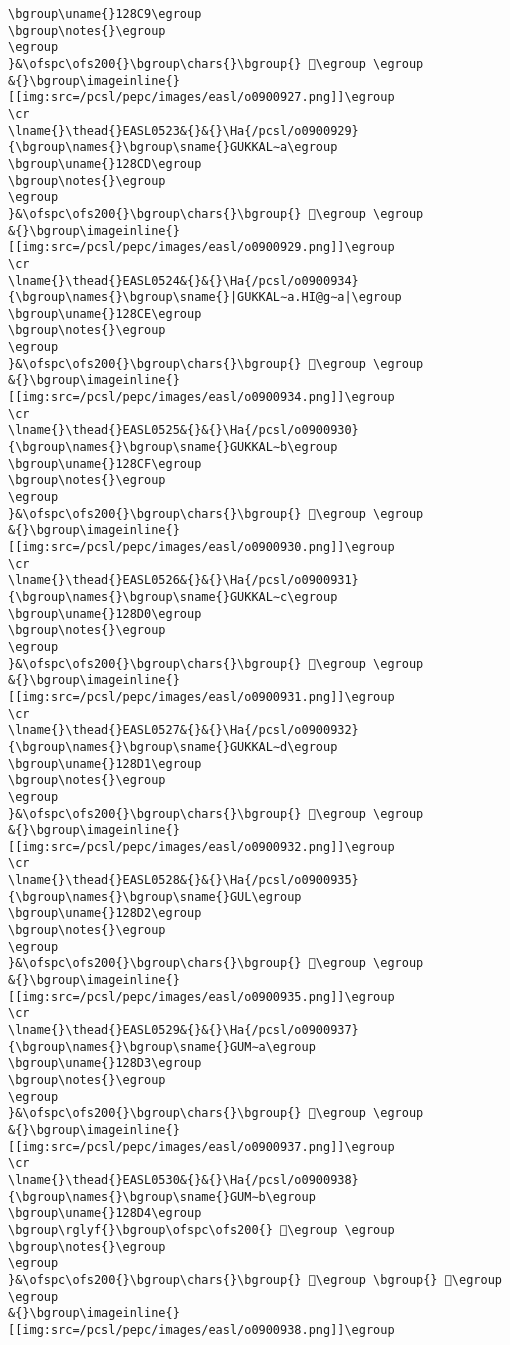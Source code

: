 \begin{verbatim}
\bgroup\uname{}128C9\egroup
\bgroup\notes{}\egroup
\egroup
}&\ofspc\ofs200{}\bgroup\chars{}\bgroup{} 𒣉\egroup \egroup
&{}\bgroup\imageinline{}[[img:src=/pcsl/pepc/images/easl/o0900927.png]]\egroup
\cr
\lname{}\thead{}EASL0523&{}&{}\Ha{/pcsl/o0900929}{\bgroup\names{}\bgroup\sname{}GUKKAL∼a\egroup
\bgroup\uname{}128CD\egroup
\bgroup\notes{}\egroup
\egroup
}&\ofspc\ofs200{}\bgroup\chars{}\bgroup{} 𒣍\egroup \egroup
&{}\bgroup\imageinline{}[[img:src=/pcsl/pepc/images/easl/o0900929.png]]\egroup
\cr
\lname{}\thead{}EASL0524&{}&{}\Ha{/pcsl/o0900934}{\bgroup\names{}\bgroup\sname{}|GUKKAL∼a.HI@g∼a|\egroup
\bgroup\uname{}128CE\egroup
\bgroup\notes{}\egroup
\egroup
}&\ofspc\ofs200{}\bgroup\chars{}\bgroup{} 𒣎\egroup \egroup
&{}\bgroup\imageinline{}[[img:src=/pcsl/pepc/images/easl/o0900934.png]]\egroup
\cr
\lname{}\thead{}EASL0525&{}&{}\Ha{/pcsl/o0900930}{\bgroup\names{}\bgroup\sname{}GUKKAL∼b\egroup
\bgroup\uname{}128CF\egroup
\bgroup\notes{}\egroup
\egroup
}&\ofspc\ofs200{}\bgroup\chars{}\bgroup{} 𒣏\egroup \egroup
&{}\bgroup\imageinline{}[[img:src=/pcsl/pepc/images/easl/o0900930.png]]\egroup
\cr
\lname{}\thead{}EASL0526&{}&{}\Ha{/pcsl/o0900931}{\bgroup\names{}\bgroup\sname{}GUKKAL∼c\egroup
\bgroup\uname{}128D0\egroup
\bgroup\notes{}\egroup
\egroup
}&\ofspc\ofs200{}\bgroup\chars{}\bgroup{} 𒣐\egroup \egroup
&{}\bgroup\imageinline{}[[img:src=/pcsl/pepc/images/easl/o0900931.png]]\egroup
\cr
\lname{}\thead{}EASL0527&{}&{}\Ha{/pcsl/o0900932}{\bgroup\names{}\bgroup\sname{}GUKKAL∼d\egroup
\bgroup\uname{}128D1\egroup
\bgroup\notes{}\egroup
\egroup
}&\ofspc\ofs200{}\bgroup\chars{}\bgroup{} 𒣑\egroup \egroup
&{}\bgroup\imageinline{}[[img:src=/pcsl/pepc/images/easl/o0900932.png]]\egroup
\cr
\lname{}\thead{}EASL0528&{}&{}\Ha{/pcsl/o0900935}{\bgroup\names{}\bgroup\sname{}GUL\egroup
\bgroup\uname{}128D2\egroup
\bgroup\notes{}\egroup
\egroup
}&\ofspc\ofs200{}\bgroup\chars{}\bgroup{} 𒣒\egroup \egroup
&{}\bgroup\imageinline{}[[img:src=/pcsl/pepc/images/easl/o0900935.png]]\egroup
\cr
\lname{}\thead{}EASL0529&{}&{}\Ha{/pcsl/o0900937}{\bgroup\names{}\bgroup\sname{}GUM∼a\egroup
\bgroup\uname{}128D3\egroup
\bgroup\notes{}\egroup
\egroup
}&\ofspc\ofs200{}\bgroup\chars{}\bgroup{} 𒣓\egroup \egroup
&{}\bgroup\imageinline{}[[img:src=/pcsl/pepc/images/easl/o0900937.png]]\egroup
\cr
\lname{}\thead{}EASL0530&{}&{}\Ha{/pcsl/o0900938}{\bgroup\names{}\bgroup\sname{}GUM∼b\egroup
\bgroup\uname{}128D4\egroup
\bgroup\rglyf{}\bgroup\ofspc\ofs200{} 𒣔\egroup \egroup
\bgroup\notes{}\egroup
\egroup
}&\ofspc\ofs200{}\bgroup\chars{}\bgroup{} 𒣔\egroup \bgroup{} 𒣗\egroup \egroup
&{}\bgroup\imageinline{}[[img:src=/pcsl/pepc/images/easl/o0900938.png]]\egroup

\end{verbatim}
